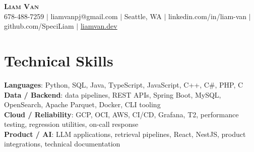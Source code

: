 \documentclass[letterpaper,11pt]{article}
\begin{document}

%
\begin{center}
    \textbf{\Huge \scshape Liam Van} \\ \vspace{1pt}
    \small 678-488-7259 $|$ \small {liamvanpj@gmail.com} $|$ Seattle, WA
 {{$|$ linkedin.com/in/liam-van} {$|$ github.com/SpeciLiam} {$|$ \href{https://liamvan.dev}{liamvan.dev}}}

\end{center}

\section{Technical Skills}
 \begin{itemize}[leftmargin=0.15in, label={}]
    \small{\item{
     \textbf{Languages}{: Python, SQL, Java, TypeScript, JavaScript, C++, C\#, PHP, C} \\
     \textbf{Data / Backend}{: data pipelines, REST APIs, Spring Boot, MySQL, OpenSearch, Apache Parquet, Docker, CLI tooling} \\
     \textbf{Cloud / Reliability}{: GCP, OCI, AWS, CI/CD, Grafana, T2, performance testing, regression utilities, on-call response} \\
     \textbf{Product / AI}{: LLM applications, retrieval pipelines, React, NestJS, product integrations, technical documentation} \\
    }}
 \end{itemize}
%
\end{document}
